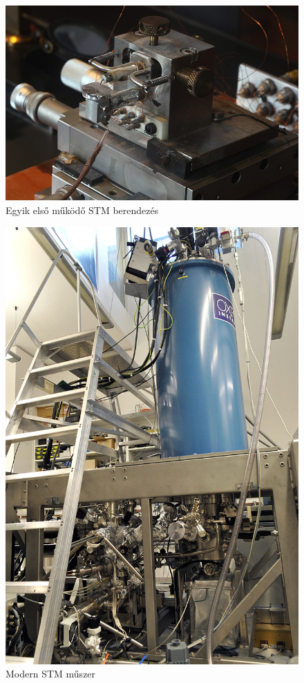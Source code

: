 \documentclass[aspectratio=169]{beamer}
\begin{document}
\begin{frame}
\begin{minipage}[m]{.63\linewidth}
\begin{figure}
\includegraphics[width=.95\textwidth]{stm_1.jpg}
\caption{Egyik első működő STM berendezés}
\end{figure}
\end{minipage}
\begin{minipage}[m]{.36\linewidth}
\begin{figure}
\includegraphics[width=.8\textwidth]{stm_2.jpg}
\caption{Modern STM műszer}
\end{figure}
\end{minipage}
\end{frame}
\end{document}
